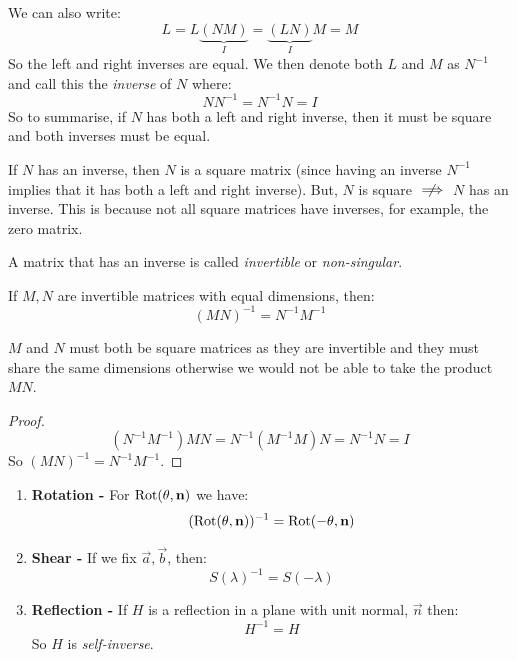 \documentclass[../main.tex]{subfiles}
\begin{document}
We can also write:
\[
  L = L \underbrace{(NM)}_{I} = \underbrace{(LN)}_{I}M = M
\]
So the left and right inverses are equal.
We then denote both $L$ and $M$ as $N^{-1}$ and call this the \textit{inverse} of $N$ where:
\[
  N N^{-1} = N^{-1} N = I
\]
So to summarise, if $N$ has both a left and right inverse, then it must be square and both inverses must be equal.
\begin{remark}
  If $N$ has an inverse, then $N$ is a square matrix (since having an inverse $N^{-1}$ implies that it has both a left and right inverse).
  But, $N$ is square $\centernot\implies$ $N$ has an inverse.
  This is because not all square matrices have inverses, for example, the zero matrix.

  A matrix that has an inverse is called \textit{invertible} or \textit{non-singular}.
\end{remark}
\begin{proposition}
  If $M, N$ are invertible matrices with equal dimensions, then:
  \[
    (MN)^{-1} = N^{-1} M^{-1}
  \]
\end{proposition}
\begin{remark}
  $M$ and $N$ must both be square matrices as they are invertible and they must share the same dimensions otherwise we would not be able to take the product $MN$.
\end{remark}
\begin{proof}
  \[
    (N^{-1} M^{-1})MN = N^{-1} (M^{-1} M) N = N^{-1} N = I
  \]
  So $(MN)^{-1} = N^{-1} M^{-1}$.
\end{proof}
\begin{example}
  \begin{enumerate}
    \item \textbf{Rotation -} For $\operatorname{Rot}(\theta, \mathbf{\bm{n}})$ we have:
      \[
        (\operatorname{Rot}(\theta, \mathbf{\bm{n}}))^{-1} = \operatorname{Rot}(-\theta, \mathbf{\bm{n}})
      \]
    \item \textbf{Shear -} If we fix $\vec{a}, \vec{b}$, then:
      \[
        S(\lambda)^{-1} = S(-\lambda)
      \]
    \item \textbf{Reflection -} If $H$ is a reflection in a plane with unit normal, $\vec{n}$ then:
      \[
        H^{-1} = H
      \]
      So $H$ is \textit{self-inverse}.
  \end{enumerate}
\end{example}
\end{document}
